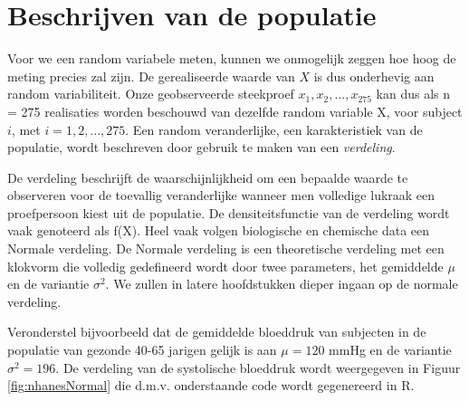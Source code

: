 \documentclass[12pt,dutch,coursenotes]{book}
\theoremstyle{definition}
\theoremstyle{definition}
\theoremstyle{definition}
\theoremstyle{remark}
\begin{document}
\section{Beschrijven van de
populatie}\label{beschrijven-van-de-populatie}

Voor we een random variabele meten, kunnen we onmogelijk zeggen hoe hoog
de meting precies zal zijn. De gerealiseerde waarde van \(X\) is dus
onderhevig aan random variabiliteit. Onze geobserveerde steekproef
\(x_1, x_2, . . . , x_{275}\) kan dus als n = 275 realisaties worden
beschouwd van dezelfde random variable X, voor subject \(i\), met
\(i = 1,2,...,275\). Een random veranderlijke, een karakteristiek van de
populatie, wordt beschreven door gebruik te maken van een
\emph{verdeling}.

De verdeling beschrijft de waarschijnlijkheid om een bepaalde waarde te
observeren voor de toevallig veranderlijke wanneer men volledige lukraak
een proefpersoon kiest uit de populatie. De densiteitsfunctie van de
verdeling wordt vaak genoteerd als f(X). Heel vaak volgen biologische en
chemische data een Normale verdeling. De Normale verdeling is een
theoretische verdeling met een klokvorm die volledig gedefineerd wordt
door twee parameters, het gemiddelde \(\mu\) en de variantie
\(\sigma^2\). We zullen in latere hoofdstukken dieper ingaan op de
normale verdeling.

Veronderstel bijvoorbeeld dat de gemiddelde bloeddruk van subjecten in
de populatie van gezonde 40-65 jarigen gelijk is aan \(\mu=120\) mmHg en
de variantie \(\sigma^2=196\). De verdeling van de systolische bloeddruk
wordt weergegeven in Figuur \ref{fig:nhanesNormal} die d.m.v.
onderstaande code wordt gegenereerd in R.
\end{document}
